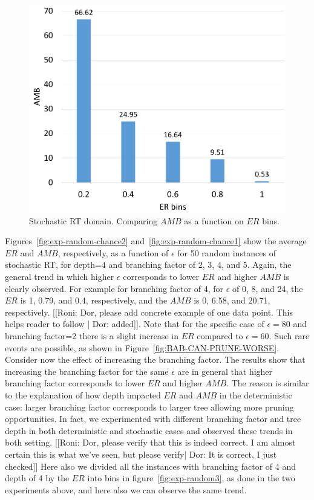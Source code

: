\documentclass[letterpaper]{article} %
\newcommand{\amb}{\mathit{AMB}}
\newcommand{\er}{\mathit{ER}}
\begin{document}
\begin{figure}
	\centering
	\includegraphics[width=0.8\columnwidth]{Figures/Random_Trees_BAB_depth_chance2_bins.pdf}
    \caption{Stochastic RT domain. Comparing $\amb$ as a function on $\er$ bins.}
	\label{fig:exp-random-chance3}
\end{figure}

Figures~\ref{fig:exp-random-chance2} and~\ref{fig:exp-random-chance1} 
show the average $\er$ and $\amb$, respectively, as a function of $\epsilon$ for 50 random instances of stochastic RT, for depth=$4$ and branching factor of $2$, $3$, $4$, and $5$. Again, the general trend in which higher $\epsilon$ corresponds to lower $\er$ and higher $\amb$ is clearly observed. For example for branching factor of 4, for $\epsilon$ of 0, 8, and 24, the $\er$ is 1, 0.79, and 0.4, respectively, and the $\amb$ is 0, 6.58, and 20.71, respectively.
[[Roni: Dor, please add concrete example of one data point. This helps reader to follow | Dor: added]]. Note that for the specific case of $\epsilon=80$ and branching factor=2 there is a slight increase in $\er$ compared to $\epsilon=60$. Such rare events are possible, as shown in Figure~\ref{fig:BAB-CAN-PRUNE-WORSE}. 
Consider now the effect of increasing the branching factor. The results show that increasing the branching factor for the same $\epsilon$ are in general that higher branching factor corresponds to lower $\er$ and higher $\amb$. The reason is similar to the explanation of how depth impacted $\er$ and $\amb$ in the deterministic case: larger branching factor corresponds to larger tree allowing more pruning opportunities. 
In fact, we experimented with different branching factor and tree depth in both deterministic and stochastic cases and observed these trends in both setting. [[Roni: Dor, please verify that this is indeed correct. I am almost certain this is what we've seen, but please verify| Dor: It is correct, I just checked]] Here also we divided all the instances with branching factor of 4 and depth of 4 by the $\er$ into bins in figure~\ref{fig:exp-random3}, as done in the two experiments above, and here also we can observe the same trend. 
\end{document}
